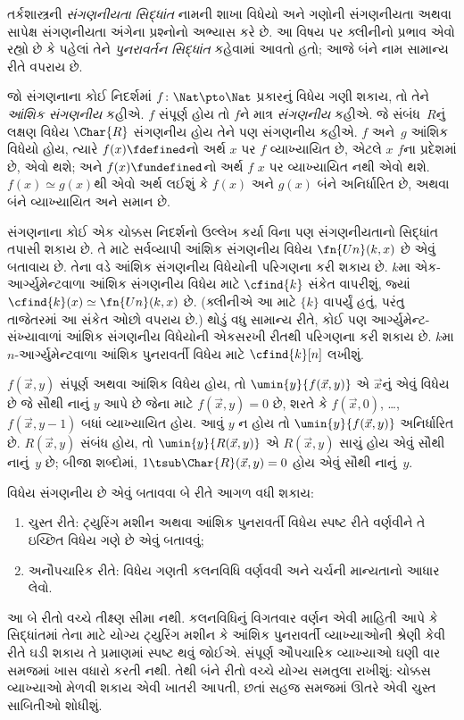 \documentclass[../../../include/open-logic-section]{subfiles}
\begin{document}

તર્કશાસ્ત્રની \emph{સંગણનીયતા સિદ્ધાંત} નામની શાખા વિધેયો અને ગણોની
સંગણનીયતા અથવા સાપેક્ષ સંગણનીયતા અંગેના પ્રશ્નોનો અભ્યાસ કરે છે.
આ વિષય પર ક્લીનીનો પ્રભાવ એવો રહ્યો છે કે પહેલાં તેને \emph{પુનરાવર્તન
  સિદ્ધાંત} કહેવામાં આવતો હતો; આજે બંને નામ સામાન્ય રીતે વપરાય છે.

જો સંગણનાના કોઈ નિદર્શમાં $f\colon \Nat \pto \Nat$ પ્રકારનું વિધેય
ગણી શકાય, તો તેને \emph{આંશિક સંગણનીય} કહીએ. $f$ સંપૂર્ણ હોય તો
$f$ને માત્ર \emph{સંગણનીય} કહીએ. જે સંબંધ~$R$નું લક્ષણ વિધેય
$\Char{R}$ સંગણનીય હોય તેને પણ સંગણનીય કહીએ. $f$ અને~$g$ આંશિક
વિધેયો હોય, ત્યારે $f(x) \fdefined$નો અર્થ $x$ પર $f$ વ્યાખ્યાયિત
છે, એટલે $x$ $f$ના પ્રદેશમાં છે, એવો થશે; અને $f(x) \fundefined$નો
અર્થ $f$ $x$ પર વ્યાખ્યાયિત નથી એવો થશે. $f(x) \simeq g(x)$થી એવો અર્થ લઈશું કે
$f(x)$ અને $g(x)$ બંને અનિર્ધારિત છે, અથવા બંને વ્યાખ્યાયિત અને
સમાન છે.

સંગણનાના કોઈ એક ચોક્કસ નિદર્શનો ઉલ્લેખ કર્યા વિના પણ સંગણનીયતાનો
સિદ્ધાંત તપાસી શકાય છે. તે માટે સર્વવ્યાપી આંશિક સંગણનીય વિધેય
$\fn{Un}(k,x)$ છે એવું બતાવાય છે. તેના વડે આંશિક સંગણનીય વિધેયોની
પરિગણના કરી શકાય છે. $k$મા એક-આર્ગ્યુમેન્ટવાળા આંશિક સંગણનીય
વિધેય માટે $\cfind{k}$ સંકેત વાપરીશું, જ્યાં
$\cfind{k}(x) \simeq \fn{Un}(k,x)$ છે. (ક્લીનીએ આ માટે
$\{ k \}$ વાપર્યું હતું, પરંતુ તાજેતરમાં આ સંકેત ઓછો વપરાય છે.)
થોડું વધુ સામાન્ય રીતે, કોઈ પણ આર્ગ્યુમેન્ટ-સંખ્યાવાળાં આંશિક
સંગણનીય વિધેયોની એકસરખી રીતથી પરિગણના કરી શકાય છે. $k$મા
$n$-આર્ગ્યુમેન્ટવાળા આંશિક પુનરાવર્તી વિધેય માટે
$\cfind{k}[n]$ લખીશું.

$f(\vec x,y)$ સંપૂર્ણ અથવા આંશિક વિધેય હોય, તો
$\umin{y}{f(\vec x,y)}$ એ $\vec x$નું એવું વિધેય છે જે સૌથી નાનું
$y$ આપે છે જેના માટે $f(\vec x,y)=0$ છે, શરતે કે
$f(\vec x,0)$, \dots, $f(\vec x,y-1)$ બધાં વ્યાખ્યાયિત હોય.
આવું $y$ ન હોય તો $\umin{y}{f(\vec x,y)}$ અનિર્ધારિત છે.
$R(\vec x,y)$ સંબંધ હોય, તો $\umin{y}{R(\vec x,y)}$ એ
$R(\vec x,y)$ સાચું હોય એવું સૌથી નાનું~$y$ છે; બીજા શબ્દોમાં,
$1 \tsub \Char{R}(\vec x,y)=0$ હોય એવું સૌથી નાનું~$y$.

વિધેય સંગણનીય છે એવું બતાવવા બે રીતે આગળ વધી શકાય:
\begin{enumerate}
\item ચુસ્ત રીતે: ટ્યુરિંગ મશીન અથવા આંશિક પુનરાવર્તી વિધેય
  સ્પષ્ટ રીતે વર્ણવીને તે ઇચ્છિત વિધેય ગણે છે એવું બતાવવું;
\item અનૌપચારિક રીતે: વિધેય ગણતી કલનવિધિ વર્ણવવી અને ચર્ચની
  માન્યતાનો આધાર લેવો.
\end{enumerate}
આ બે રીતો વચ્ચે તીક્ષ્ણ સીમા નથી. કલનવિધિનું વિગતવાર વર્ણન એવી
માહિતી આપે કે સિદ્ધાંતમાં તેના માટે યોગ્ય ટ્યુરિંગ મશીન કે આંશિક
પુનરાવર્તી વ્યાખ્યાઓની શ્રેણી કેવી રીતે ઘડી શકાય તે પ્રમાણમાં સ્પષ્ટ
થવું જોઈએ. સંપૂર્ણ ઔપચારિક વ્યાખ્યાઓ ઘણી વાર સમજમાં ખાસ વધારો
કરતી નથી. તેથી બંને રીતો વચ્ચે યોગ્ય સમતુલા રાખીશું: ચોક્કસ
વ્યાખ્યાઓ મેળવી શકાય એવી ખાતરી આપતી, છતાં સહજ સમજમાં ઊતરે એવી
ચુસ્ત સાબિતીઓ શોધીશું.
\end{document}
